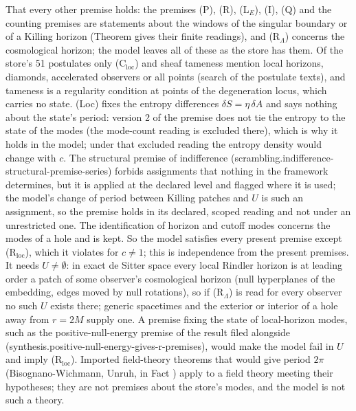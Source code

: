 That every other premise holds: the premises (P), (R), (L$_E$), (I), (Q) and the counting premises are statements about the windows of the singular boundary or of a Killing horizon (Theorem  gives their finite readings), and (R$_{\Lambda}$) concerns the cosmological horizon; the model leaves all of these as the store has them. Of the store's 51 postulates only (C$_{\mathrm{loc}}$) and sheaf tameness mention local horizons, diamonds, accelerated observers or all points (search of the postulate texts), and tameness is a regularity condition at points of the degeneration locus, which carries no state. (Loc) fixes the entropy differences $\delta S = \eta\,\delta A$ and says nothing about the state's period: version 2 of the premise does not tie the entropy to the state of the modes (the mode-count reading is excluded there), which is why it holds in the model; under that excluded reading the entropy density would change with $c$. The structural premise of indifference (scrambling.indifference-structural-premise-series) forbids assignments that nothing in the framework determines, but it is applied at the declared level and flagged where it is used; the model's change of period between Killing patches and $U$ is such an assignment, so the premise holds in its declared, scoped reading and not under an unrestricted one. The identification of horizon and cutoff modes concerns the modes of a hole and is kept. So the model satisfies every present premise except (R$_{\mathrm{loc}}$), which it violates for $c \ne 1$; this is independence from the present premises. It needs $U \ne \emptyset$: in exact de Sitter space every local Rindler horizon is at leading order a patch of some observer's cosmological horizon (null hyperplanes of the embedding, edges moved by null rotations), so if (R$_{\Lambda}$) is read for every observer no such $U$ exists there; generic spacetimes and the exterior or interior of a hole away from $r = 2M$ supply one. A premise fixing the state of local-horizon modes, such as the positive-null-energy premise of the result filed alongside (synthesis.positive-null-energy-gives-r-premises), would make the model fail in $U$ and imply (R$_{\mathrm{loc}}$). Imported field-theory theorems that would give period $2\pi$ (Bisognano-Wichmann, Unruh, in Fact ) apply to a field theory meeting their hypotheses; they are not premises about the store's modes, and the model is not such a theory.

